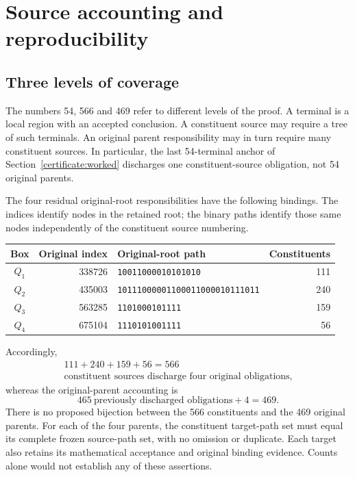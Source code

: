 \documentclass[11pt,reqno]{amsart}
\theoremstyle{definition}
\theoremstyle{remark}
\begin{document}
\section{Source accounting and reproducibility}
\label{certificate:details}
\subsection{Three levels of coverage}
\label{certificate:levels}

The numbers 54, 566 and 469 refer to different levels of the proof.
A terminal is a local region with an accepted conclusion. A constituent
source may require a tree of such terminals. An original parent
responsibility may in turn require many constituent sources.
In particular, the last 54-terminal anchor of
Section~\ref{certificate:worked} discharges one constituent-source
obligation, not 54
original parents.

The four residual original-root responsibilities have the following
bindings. The indices identify nodes in the retained root; the binary
paths identify those same nodes independently of the constituent
source numbering.
\begin{center}
\small
\begin{tabular}{@{}crlr@{}}
\toprule
Box & Original index & Original-root path & Constituents \\
\midrule
\(Q_1\)&338726&\texttt{10011000010101010}&111\\
\(Q_2\)&435003&\texttt{10111000001100011000010111011}&240\\
\(Q_3\)&563285&\texttt{1101000101111}&159\\
\(Q_4\)&675104&\texttt{1110101001111}&56\\
\bottomrule
\end{tabular}
\end{center}
Accordingly,
\[
\begin{gathered}
111+240+159+56=566\\
\text{constituent sources discharge four original obligations},
\end{gathered}
\]
whereas the original-parent accounting is
\[
465\ \text{previously discharged obligations}+4=469.
\]
There is no proposed bijection between the 566 constituents and the
469 original parents. For each of the four parents, the constituent
target-path set must equal its complete frozen source-path set, with
no omission or duplicate. Each target also retains its mathematical
acceptance and original binding evidence. Counts alone would not
establish any of these assertions.
\end{document}
